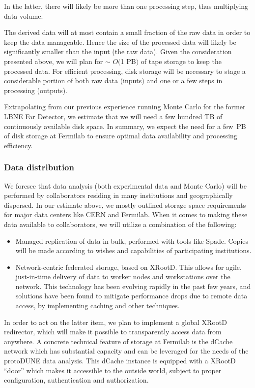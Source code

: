 In the latter, there will likely be more than one processing step, thus multiplying data volume. 

The derived data will at most contain a small fraction of the raw data in order to keep the data manageable.
Hence the size of the processed data will likely be significantly smaller than the input (the raw data). 
Given the consideration presented above, we will plan for
$\sim$ $O($1 PB$)$ of tape storage to keep the processed data. 
For efficient processing, disk storage will be necessary
to stage a considerable portion of both raw data (inputs) and one or a few steps in processing (outputs).

Extrapolating from our previous experience running Monte Carlo for the former LBNE Far Detector, we estimate that we will need a few hundred TB of continuously available
disk space. In summary, we expect the need for a few~PB of disk storage at Fermilab to ensure optimal data availability and 
processing efficiency. 

\subsubsection{Data distribution}
We foresee that data analysis (both experimental data and Monte Carlo) will be performed by collaborators residing in many 
institutions and geographically dispersed. In our
estimate above, we mostly outlined storage space requirements for major data centers like CERN and Fermilab. When it comes to making these data available to collaborators, we will utilize a combination of the following:
\begin{itemize}
\item Managed replication of data in bulk, performed with tools like Spade. Copies will be made according to wishes and capabilities of participating institutions.
\item Network-centric federated storage, based on XRootD. This allows for agile, just-in-time delivery of data to worker nodes and workstations over the network. This
technology has been evolving rapidly in the past few years, and solutions have been found to mitigate performance drops due to remote data access, by implementing caching and other techniques.
\end{itemize}

In order to act on the latter item, we plan to implement a global XRootD redirector, which will make it possible to transparently access data from anywhere.
A concrete technical feature of storage at Fermilab is the dCache network which has substantial capacity and can be leveraged
for the needs of the protoDUNE data analysis. This dCache instance is equipped with a XRootD ``door'' which makes it accessible to the outside world, subject
to proper configuration, authentication and authorization.


